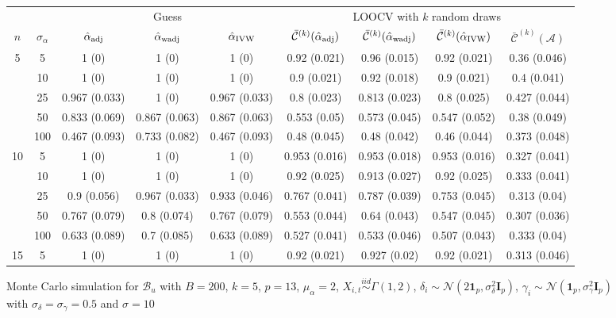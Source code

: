 \documentclass[10pt]{article}
\newcommand{\simiid}{\stackrel{iid}{\sim}} %
\def\normal#1#2{\mathcal{N}(#1,#2)} %
\def\mc#1{\mathcal{#1}} %
\theoremstyle{definition}
\begin{document}


\begin{sidewaysfigure}
\centering
\caption{Monte Carlo simulation  for $\mc{B}_u$ with $B = 200$, $k = 5$, $p = 13$, $\mu_{\alpha}=2$, $X_{i,t} \simiid \Gamma(1,2)$, $\delta_i \sim \normal{2\mathbf{1}_p}{\sigma^2_{\delta}\mathbf{I}_p}$, $\gamma_i \sim \normal{\mathbf{1}_p}{\sigma^2_{\gamma}\mathbf{I}_p}$ with $\sigma_{\delta}=\sigma_{\gamma}=0.5$ and $\sigma = 10$}
\begin{tabular}{cc|ccc|cccc}
   &   & \multicolumn{3}{|c|}{Guess} & \multicolumn{4}{|c}{LOOCV with $k$ random draws}  \\ 
 $n$   & $\sigma_{\alpha}$ &  $\hat{\alpha}_{\rm adj}$  & $\hat{\alpha}_{\rm wadj}$ & $\hat{\alpha}_{\rm IVW}$  & $\bar{\mc{C}}^{(k)}(\hat{\alpha}_{\rm adj})$  & $\bar{\mc{C}}^{(k)}(\hat{\alpha}_{\rm wadj})$ & $\bar{\mc{C}}^{(k)}(\hat{\alpha}_{\rm IVW})$ &  $\bar{\mc{C}}^{(k)}(\mc{A})$ \\[.3cm]  
  \hline
  \multirow{5}{*}{5} & 5  & 1 (0) & 1 (0) & 1 (0) & 0.92 (0.021) & 0.96 (0.015) & 0.92 (0.021) & 0.36 (0.046) \\ 
    & 10  & 1 (0) & 1 (0) & 1 (0) & 0.9 (0.021) & 0.92 (0.018) & 0.9 (0.021) & 0.4 (0.041) \\ 
    & 25  & 0.967 (0.033) & 1 (0) & 0.967 (0.033) & 0.8 (0.023) & 0.813 (0.023) & 0.8 (0.025) & 0.427 (0.044) \\ 
    & 50  & 0.833 (0.069) & 0.867 (0.063) & 0.867 (0.063) & 0.553 (0.05) & 0.573 (0.045) & 0.547 (0.052) & 0.38 (0.049) \\ 
    & 100  & 0.467 (0.093) & 0.733 (0.082) & 0.467 (0.093) & 0.48 (0.045) & 0.48 (0.042) & 0.46 (0.044) & 0.373 (0.048) \\[.3cm] 
    \multirow{5}{*}{10} & 5  & 1 (0) & 1 (0) & 1 (0) & 0.953 (0.016) & 0.953 (0.018) & 0.953 (0.016) & 0.327 (0.041) \\ 
    & 10  & 1 (0) & 1 (0) & 1 (0) & 0.92 (0.025) & 0.913 (0.027) & 0.92 (0.025) & 0.333 (0.041) \\ 
    & 25  & 0.9 (0.056) & 0.967 (0.033) & 0.933 (0.046) & 0.767 (0.041) & 0.787 (0.039) & 0.753 (0.045) & 0.313 (0.04) \\ 
    & 50  & 0.767 (0.079) & 0.8 (0.074) & 0.767 (0.079) & 0.553 (0.044) & 0.64 (0.043) & 0.547 (0.045) & 0.307 (0.036) \\ 
    & 100  & 0.633 (0.089) & 0.7 (0.085) & 0.633 (0.089) & 0.527 (0.041) & 0.533 (0.046) & 0.507 (0.043) & 0.333 (0.04) \\[.3cm] 
    \multirow{5}{*}{15} & 5  & 1 (0) & 1 (0) & 1 (0) & 0.92 (0.021) & 0.927 (0.02) & 0.92 (0.021) & 0.313 (0.046) \\ 

\end{tabular}
\end{sidewaysfigure}
\end{document}
